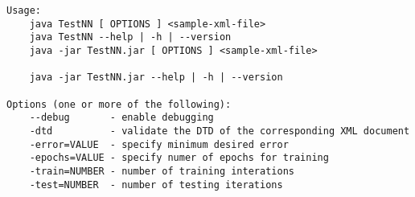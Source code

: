 \begin{verbatim}
Usage:
    java TestNN [ OPTIONS ] <sample-xml-file>
    java TestNN --help | -h | --version
    java -jar TestNN.jar [ OPTIONS ] <sample-xml-file>

    java -jar TestNN.jar --help | -h | --version

Options (one or more of the following):
    --debug       - enable debugging
    -dtd          - validate the DTD of the corresponding XML document
    -error=VALUE  - specify minimum desired error
    -epochs=VALUE - specify numer of epochs for training
    -train=NUMBER - number of training interations
    -test=NUMBER  - number of testing iterations

\end{verbatim}
